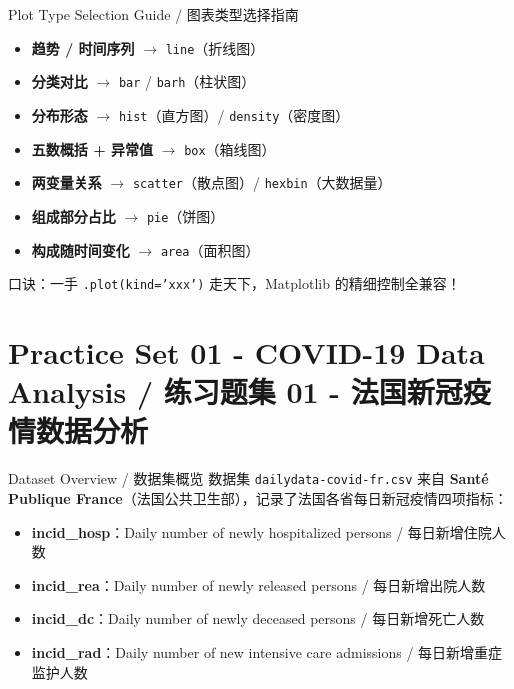 \documentclass[11pt,a4paper]{report}
\let\oldtexttt\texttt
\renewcommand{\texttt}[1]{\textcolor{mainblue}{\oldtexttt{#1}}}
\begin{document}
\begin{concept}{Plot Type Selection Guide / 图表类型选择指南}
    \begin{itemize}[itemsep=0.5em]
        \item \textbf{趋势 / 时间序列} $\rightarrow$ \texttt{line}（折线图）
        \item \textbf{分类对比} $\rightarrow$ \texttt{bar} / \texttt{barh}（柱状图）
        \item \textbf{分布形态} $\rightarrow$ \texttt{hist}（直方图）/ \texttt{density}（密度图）
        \item \textbf{五数概括 + 异常值} $\rightarrow$ \texttt{box}（箱线图）
        \item \textbf{两变量关系} $\rightarrow$ \texttt{scatter}（散点图）/ \texttt{hexbin}（大数据量）
        \item \textbf{组成部分占比} $\rightarrow$ \texttt{pie}（饼图）
        \item \textbf{构成随时间变化} $\rightarrow$ \texttt{area}（面积图）
    \end{itemize}
    口诀：一手 \texttt{.plot(kind='xxx')} 走天下，Matplotlib 的精细控制全兼容！
\end{concept}

\chapter{Practice Set 01 - COVID-19 Data Analysis / 练习题集 01 - 法国新冠疫情数据分析}

\begin{concept}{Dataset Overview / 数据集概览}
    数据集 \texttt{dailydata-covid-fr.csv} 来自 \textbf{Santé Publique France}（法国公共卫生部），记录了法国各省每日新冠疫情四项指标：
    \begin{itemize}[itemsep=0.3em]
        \item \textbf{incid\_hosp}：Daily number of newly hospitalized persons / 每日新增住院人数
        \item \textbf{incid\_rea}：Daily number of newly released persons / 每日新增出院人数
        \item \textbf{incid\_dc}：Daily number of newly deceased persons / 每日新增死亡人数
        \item \textbf{incid\_rad}：Daily number of new intensive care admissions / 每日新增重症监护人数
    \end{itemize}
\end{concept}
\end{document}
